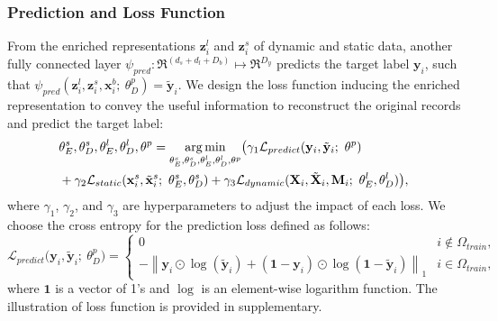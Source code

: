 \subsubsection{Prediction and Loss Function}
From the enriched representations $\mathbf{z}_i^l$ and $\mathbf{z}_i^s$ of dynamic and static data, another fully connected layer $\psi_{pred}: \Re^{(d_s + d_l + D_b)}  \mapsto \Re^{D_y}$ predicts the target label $\mathbf{y}_i$, such that $\psi_{pred}(\mathbf{z}_i^l, \mathbf{z}_i^s, \mathbf{x}_i^b;\ \theta_{D}^p) = \tilde{\mathbf{y}}_i$.
We design the loss function inducing the enriched representation to convey the useful information to reconstruct the original records and predict the target label:
\begin{equation}\label{eq: total loss}
\begin{aligned}
    &\theta_{E}^s, \theta_{D}^s, \theta^l_{E}, \theta^l_{D}, \theta^p = \argmin_{\theta_{E}^s, \theta_{D}^s, \theta^l_{E}, \theta^l_{D}, \theta^p} \bigl(\gamma_1 \mathcal{L}_{predict}(\mathbf{y}_i, \tilde{\mathbf{y}}_i;\ \theta^p) \\
    & + \gamma_2 \mathcal{L}_{static}(\mathbf{x}_i^s, \tilde{\mathbf{x}}_i^s;\ \theta_{E}^s, \theta_{D}^s) + \gamma_3 \mathcal{L}_{dynamic}(\mathbf{X}_i, \tilde{\mathbf{X}}_i, \mathbf{M}_i;\ \theta^l_{E}, \theta^l_{D})\bigr),
\end{aligned}
\end{equation}
where $\gamma_1$, $\gamma_2$, and $\gamma_3$ are hyperparameters to adjust the impact of each loss. 
We choose the cross entropy for the prediction loss defined as follows:
\[
\mathcal{L}_{predict}\bigl(\mathbf{y}_i, \tilde{\mathbf{y}}_i;\ \theta_{D}^p\bigr)=
\begin{cases}
0 & i \notin \Omega_{train},\\
- \left\|\mathbf{y}_i \odot \operatorname{log}(\tilde{\mathbf{y}}_i) + (\mathbf{1} - \mathbf{y}_i) \odot \operatorname{log}(\mathbf{1} - \tilde{\mathbf{y}}_i)\right\|_1 & i \in \Omega_{train},
\end{cases}
\]
where $\mathbf{1}$ is a vector of 1's and $\operatorname{log}$ is an element-wise logarithm function. The illustration of loss function is provided in supplementary.
